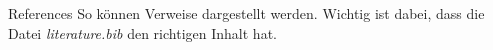 \begin{frame}{References}
    So können Verweise dargestellt werden. Wichtig ist dabei, dass die Datei \alert{\emph{literature.bib}} den richtigen Inhalt hat. \cite{ConcreteMath,Simpson,Er01,greenwade93}
  \end{frame}
